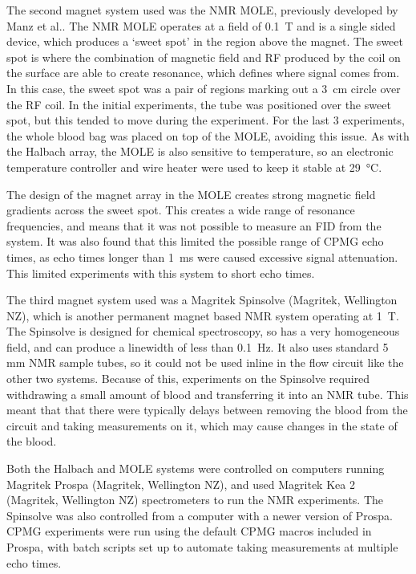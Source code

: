 The second magnet system used was the NMR MOLE, previously developed by Manz et al.\cite{ManzmobileonesidedNMR2006}.
The NMR MOLE operates at a field of \SI{0.1}{T} and is a single sided device, which produces a `sweet spot' in the region above the magnet.
The sweet spot is where the combination of magnetic field and RF produced by the coil on the surface are able to create resonance, which defines where signal comes from.
In this case, the sweet spot was a pair of regions marking out a \SI{3}{cm} circle over the RF coil.
In the initial experiments, the tube was positioned over the sweet spot, but this tended to move during the experiment.
For the last 3 experiments, the whole blood bag was placed on top of the MOLE, avoiding this issue.
As with the Halbach array, the MOLE is also sensitive to temperature, so an electronic temperature controller and wire heater were used to keep it stable at \SI{29}{\celsius}.

The design of the magnet array in the MOLE creates strong magnetic field gradients across the sweet spot.
This creates a wide range of resonance frequencies, and means that it was not possible to measure an FID from the system.
It was also found that this limited the possible range of CPMG echo times, as echo times longer than \SI{1}{ms} were caused excessive signal attenuation.
This limited experiments with this system to short echo times.

The third magnet system used was a Magritek Spinsolve (Magritek, Wellington NZ), which is another permanent magnet based NMR system operating at \SI{1}{T}.
The Spinsolve is designed for chemical spectroscopy, so has a very homogeneous field, and can produce a linewidth of less than \SI{0.1}{Hz}.
It also uses standard 5 mm NMR sample tubes, so it could not be used inline in the flow circuit like the other two systems.
Because of this, experiments on the Spinsolve required withdrawing a small amount of blood and transferring it into an NMR tube.
This meant that that there were typically delays between removing the blood from the circuit and taking measurements on it, which may cause changes in the state of the blood.

Both the Halbach and MOLE systems were controlled on computers running Magritek Prospa (Magritek, Wellington NZ), and used Magritek Kea 2 (Magritek, Wellington NZ) spectrometers to run the NMR experiments.
The Spinsolve was also controlled from a computer with a newer version of Prospa.
CPMG experiments were run using the default CPMG macros included in Prospa, with batch scripts set up to automate taking measurements at multiple echo times.

